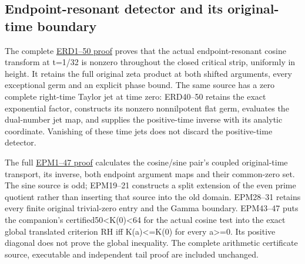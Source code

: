\documentclass[
  10pt,
  a4paper,
]{article}
\begin{document}
\subsection{Endpoint-resonant detector and its original-time
boundary}\label{endpoint-resonant-detector-and-its-original-time-boundary}

The complete \href{ENDPOINT_RESONANT_ZERO_DETECTION.md}{ERD1--50 proof}
proves that the actual endpoint-resonant cosine transform at t=1/32 is
nonzero throughout the closed critical strip, uniformly in height. It
retains the full original zeta product at both shifted arguments, every
exceptional germ and an explicit phase bound. The same source has a zero
complete right-time Taylor jet at time zero: ERD40--50 retains the exact
exponential factor, constructs its nonzero nonnilpotent flat germ,
evaluates the dual-number jet map, and supplies the positive-time
inverse with its analytic coordinate. Vanishing of these time jets does
not discard the positive-time detector.

The full \href{ENDPOINT_PAIR_TRANSPORT_AND_WEIL_MATRIX.md}{EPM1--47
proof} calculates the cosine/sine pair's coupled original-time
transport, its inverse, both endpoint argument maps and their
common-zero set. The sine source is odd; EPM19--21 constructs a split
extension of the even prime quotient rather than inserting that source
into the old domain. EPM28--31 retains every finite original
trivial-zero entry and the Gamma boundary. EPM43--47 puts the
companion's certified50\textless K(0)\textless64 for the actual cosine
test into the exact global translated criterion RH iff
\textbar K(a)\textbar\textless=K(0) for every a\textgreater=0. Its
positive diagonal does not prove the global inequality. The complete
arithmetic certificate source, executable and independent tail proof are
included unchanged.
\end{document}
